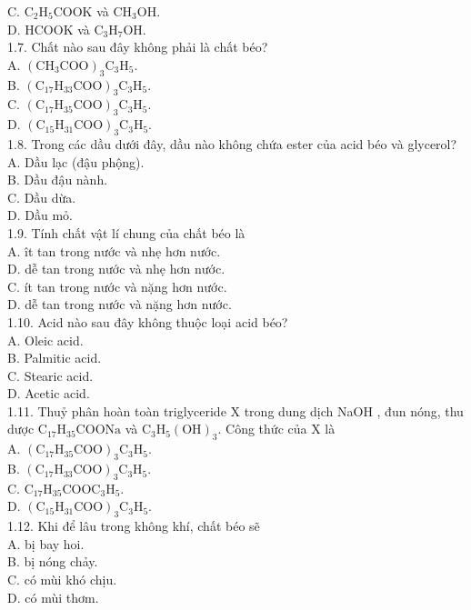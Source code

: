 \documentclass[10pt]{article}
\begin{document}
C. $\mathrm{C}_{2} \mathrm{H}_{5} \mathrm{COOK}$ và $\mathrm{CH}_{3} \mathrm{OH}$.\\
D. HCOOK và $\mathrm{C}_{3} \mathrm{H}_{7} \mathrm{OH}$.\\
1.7. Chất nào sau đây không phải là chất béo?\\
A. $\left(\mathrm{CH}_{3} \mathrm{COO}\right)_{3} \mathrm{C}_{3} \mathrm{H}_{5}$.\\
B. $\left(\mathrm{C}_{17} \mathrm{H}_{33} \mathrm{COO}\right)_{3} \mathrm{C}_{3} \mathrm{H}_{5}$.\\
C. $\left(\mathrm{C}_{17} \mathrm{H}_{35} \mathrm{COO}\right)_{3} \mathrm{C}_{3} \mathrm{H}_{5}$.\\
D. $\left(\mathrm{C}_{15} \mathrm{H}_{31} \mathrm{COO}\right)_{3} \mathrm{C}_{3} \mathrm{H}_{5}$.\\
1.8. Trong các dầu dưới đây, dầu nào không chứa ester của acid béo và glycerol?\\
A. Dầu lạc (đậu phộng).\\
B. Dầu đậu nành.\\
C. Dầu dừa.\\
D. Dầu mỏ.\\
1.9. Tính chất vật lí chung của chất béo là\\
A. ît tan trong nước và nhẹ hơn nước.\\
D. dễ tan trong nước và nhẹ hơn nước.\\
C. ít tan trong nước và nặng hơn nước.\\
D. dễ tan trong nước và nặng hơn nước.\\
1.10. Acid nào sau đây không thuộc loại acid béo?\\
A. Oleic acid.\\
B. Palmitic acid.\\
C. Stearic acid.\\
D. Acetic acid.\\
1.11. Thuỷ phân hoàn toàn triglyceride X trong dung dịch NaOH , đun nóng, thu dược $\mathrm{C}_{17} \mathrm{H}_{35} \mathrm{COONa}$ và $\mathrm{C}_{3} \mathrm{H}_{5}(\mathrm{OH})_{3}$. Công thức của X là\\
A. $\left(\mathrm{C}_{17} \mathrm{H}_{35} \mathrm{COO}\right)_{3} \mathrm{C}_{3} \mathrm{H}_{5}$.\\
B. $\left(\mathrm{C}_{17} \mathrm{H}_{33} \mathrm{COO}\right)_{3} \mathrm{C}_{3} \mathrm{H}_{5}$.\\
C. $\mathrm{C}_{17} \mathrm{H}_{35} \mathrm{COOC}_{3} \mathrm{H}_{5}$.\\
D. $\left(\mathrm{C}_{15} \mathrm{H}_{31} \mathrm{COO}\right)_{3} \mathrm{C}_{3} \mathrm{H}_{5}$.\\
1.12. Khi để lâu trong không khí, chất béo sẽ\\
A. bị bay hoi.\\
B. bị nóng chảy.\\
C. có mùi khó chịu.\\
D. có mùi thơm.
\end{document}

